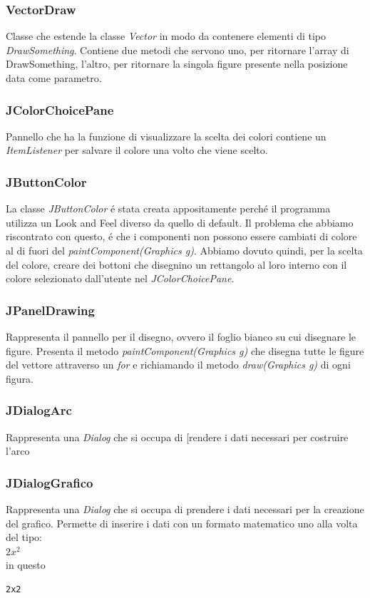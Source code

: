 \documentclass[a4paper,12pt]{article}
\begin{document}
\subsubsection{VectorDraw}
Classe che estende la classe \textit{Vector} in modo da contenere elementi di tipo \textit{DrawSomething}.
Contiene due metodi che servono uno, per ritornare l'array di DrawSomething, l'altro, per ritornare la singola figure presente nella posizione data come parametro.
\subsubsection{JColorChoicePane}
Pannello che ha la funzione di visualizzare la scelta dei colori contiene un \textit{ItemListener} per salvare il colore una volto che viene scelto.
\subsubsection{JButtonColor}
La classe \textit{JButtonColor} é stata creata appositamente perché il programma utilizza un Look and Feel diverso da quello di default. Il problema che abbiamo riscontrato con questo, é che i componenti non possono essere cambiati di colore al di fuori del \textit{paintComponent(Graphics g)}. Abbiamo dovuto quindi, per la scelta del colore, creare dei bottoni che disegnino un rettangolo al loro interno con il colore selezionato dall'utente nel \textit{JColorChoicePane}.
\subsubsection{JPanelDrawing}
Rappresenta il pannello per il disegno, ovvero il foglio bianco su cui disegnare le figure. Presenta il metodo \textit{paintComponent(Graphics g)} che disegna tutte le figure del vettore attraverso un \textit{for} e richiamando il metodo \textit{draw(Graphics g)} di ogni figura.
\subsubsection{JDialogArc}
Rappresenta una \textit{Dialog} che si occupa di [rendere i dati necessari per costruire l'arco 
\subsubsection{JDialogGrafico}
Rappresenta una \textit{Dialog} che si occupa di prendere i dati necessari per la creazione del grafico. Permette di inserire i dati con un formato matematico uno alla volta del tipo:\\
$2x^2$\\
in questo
\begin{lstlisting}
2x2
\end{lstlisting}
\end{document}
